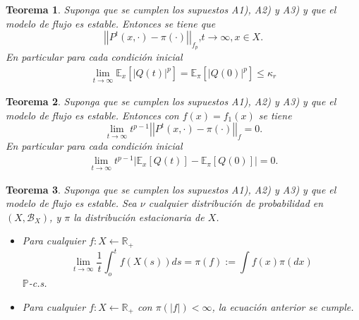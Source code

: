 \documentclass{article}
\newtheorem{Teo}{Teorema}
\newcommand{\rea}{\mathbb{R}}
\newcommand{\esp}{\mathbb{E}}
\newcommand{\prob}{\mathbb{P}}
\begin{document}
\begin{Teo}\label{Tma.6.2}
Suponga que se cumplen los supuestos A1), A2) y A3) y que el
modelo de flujo es estable. Entonces se tiene que
\begin{equation}
|\left|P^{t}\left(x,\cdot\right)-\pi\left(\cdot\right)\right||_{f_{p}}\textrm{,
}t\rightarrow\infty,x\in X.
\end{equation}
En particular para cada condici\'on inicial
\begin{eqnarray*}
\lim_{t\rightarrow\infty}\esp_{x}\left[|Q\left(t\right)|^{p}\right]=\esp_{\pi}\left[|Q\left(0\right)|^{p}\right]\leq\kappa_{r}
\end{eqnarray*}
\end{Teo}
\begin{Teo}\label{Tma.6.3}
Suponga que se cumplen los supuestos A1), A2) y A3) y que el
modelo de flujo es estable. Entonces con
$f\left(x\right)=f_{1}\left(x\right)$ se tiene
\begin{equation}
\lim_{t\rightarrow\infty}t^{p-1}|\left|P^{t}\left(x,\cdot\right)-\pi\left(\cdot\right)\right||_{f}=0.
\end{equation}
En particular para cada condici\'on inicial
\begin{eqnarray*}
\lim_{t\rightarrow\infty}t^{p-1}|\esp_{x}\left[Q\left(t\right)\right]-\esp_{\pi}\left[Q\left(0\right)\right]|=0.
\end{eqnarray*}
\end{Teo}

\begin{Teo}\label{Tma.6.4}
Suponga que se cumplen los supuestos A1), A2) y A3) y que el
modelo de flujo es estable. Sea $\nu$ cualquier distribuci\'on de
probabilidad en $\left(X,\mathcal{B}_{X}\right)$, y $\pi$ la
distribuci\'on estacionaria de $X$.
\begin{itemize}
\item[i)] Para cualquier $f:X\leftarrow\rea_{+}$
\begin{equation}
\lim_{t\rightarrow\infty}\frac{1}{t}\int_{o}^{t}f\left(X\left(s\right)\right)ds=\pi\left(f\right):=\int
f\left(x\right)\pi\left(dx\right)
\end{equation}
$\prob$-c.s. \item[ii)] Para cualquier $f:X\leftarrow\rea_{+}$ con
$\pi\left(|f|\right)<\infty$, la ecuaci\'on anterior se cumple.
\end{itemize}
\end{Teo}
\end{document}
